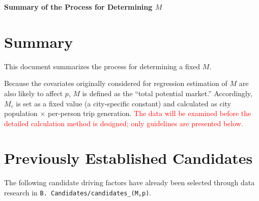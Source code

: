 \documentclass[10pt,a4paper]{article}
\begin{document}
\begin{center}{\Large\bfseries Summary of the Process for Determining $M$}\end{center}
\section{Summary}
This document summarizes the process for determining a fixed $M$.

Because the covariates originally considered for regression estimation of $M$ are also likely to affect $p$, $M$ is defined as the ``total potential market.'' Accordingly, $M_c$ is set as a fixed value (a city-specific constant) and calculated as city population $\times$ per-person trip generation. \textcolor{red}{The data will be examined before the detailed calculation method is designed; only guidelines are presented below.}

\section{Previously Established Candidates}
The following candidate driving factors have already been selected through data research in \texttt{B. Candidates/candidates\_(M,p)}.
\end{document}
